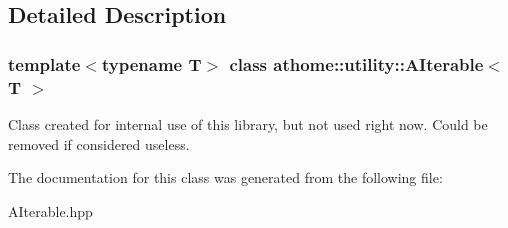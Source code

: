 \subsection{Detailed Description}
\subsubsection*{template$<$typename T$>$\newline
class athome\+::utility\+::\+A\+Iterable$<$ T $>$}

Class created for internal use of this library, but not used right now. Could be removed if considered useless. 

The documentation for this class was generated from the following file\+:\begin{DoxyCompactItemize}
\item 
A\+Iterable.\+hpp\end{DoxyCompactItemize}
